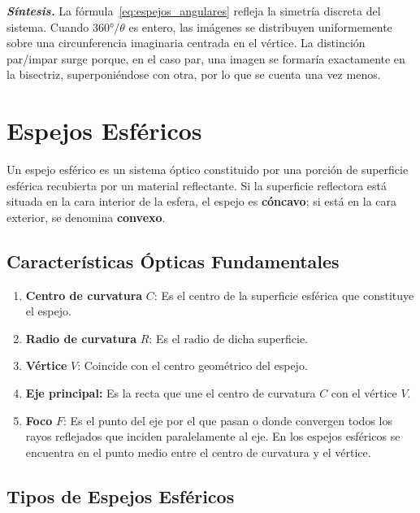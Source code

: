 \documentclass[12pt, a4paper]{article}
\theoremstyle{definition}
\begin{document}
\textit{\textbf{Síntesis.}} La fórmula~\eqref{eq:espejos_angulares} refleja la simetría discreta del sistema. Cuando \(360°/\theta\) es entero, las imágenes se distribuyen uniformemente sobre una circunferencia imaginaria centrada en el vértice. La distinción par/impar surge porque, en el caso par, una imagen se formaría exactamente en la bisectriz, superponiéndose con otra, por lo que se cuenta una vez menos.

\section{Espejos Esféricos}

Un espejo esférico es un sistema óptico constituido por una porción de superficie esférica recubierta por un material reflectante. Si la superficie reflectora está situada en la cara interior de la esfera, el espejo es \textbf{cóncavo}; si está en la cara exterior, se denomina \textbf{convexo}.

\subsection{Características Ópticas Fundamentales}

\begin{enumerate}
  \item \textbf{Centro de curvatura} \(C\): Es el centro de la superficie esférica que constituye el espejo.
  \item \textbf{Radio de curvatura} \(R\): Es el radio de dicha superficie.
  \item \textbf{Vértice} \(V\): Coincide con el centro geométrico del espejo.
  \item \textbf{Eje principal:} Es la recta que une el centro de curvatura \(C\) con el vértice \(V\).
  \item \textbf{Foco} \(F\): Es el punto del eje por el que pasan o donde convergen todos los rayos reflejados que inciden paralelamente al eje. En los espejos esféricos se encuentra en el punto medio entre el centro de curvatura y el vértice.
\end{enumerate}

\subsection{Tipos de Espejos Esféricos}
\end{document}

